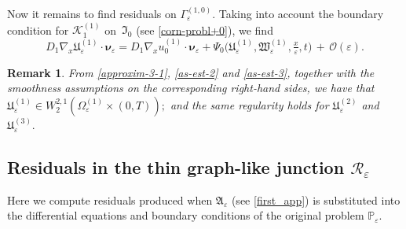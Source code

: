 \documentclass[reqno]{amsart}            %
\newtheorem{remark}{Remark}[section]
\numberwithin{equation}{section}
\begin{document}
	Now it remains to find residuals on $\Gamma_\varepsilon^{(1,0)}.$ Taking into account the boundary condition for $\mathcal{K}^{(1)}_1$ on~$\mathfrak{I}_0$ (see \eqref{corn-probl+0}), we find
	\begin{equation}\label{as-est-bd-5}
		D_1\nabla_x \mathfrak{U}_\varepsilon^{(1)} \cdot\boldsymbol{\nu}_\varepsilon = D_1\nabla_x u_0^{(1)}\cdot\boldsymbol{\nu}_\varepsilon + \Psi_0\big(\mathfrak{U}_\varepsilon^{(1)}, \mathfrak{W}^{(1)}_\varepsilon, \tfrac{x}{\varepsilon},t\big)\,  + \, \mathcal{O}(\varepsilon).
	\end{equation}
	\begin{remark}
		From \eqref{approxim-3-1}, \eqref{as-est-2} and \eqref{as-est-3}, together with the smoothness assumptions on the corresponding right-hand sides, we have that $\mathfrak{U}^{(1)}_\varepsilon	
		\in W^{2,1}_2(\Omega^{(1)}_\varepsilon\times(0,T));$ and the same regularity holds for $\mathfrak{U}^{(2)}_\varepsilon$ and $\mathfrak{U}^{(3)}_\varepsilon.$  
	\end{remark}
	
	
	\subsection{Residuals in the thin graph-like junction $\mathcal{R}_\varepsilon$}
	
	Here we compute residuals produced when $\mathfrak{A}_\varepsilon$ (see \eqref{first_app}) is substituted into the differential equations and 
	boundary conditions of the original problem $\mathbb{P}_\varepsilon$.
	
\end{document}
